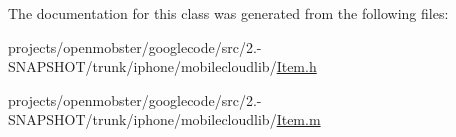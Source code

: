 \-The documentation for this class was generated from the following files\-:\begin{DoxyCompactItemize}
\item 
projects/openmobster/googlecode/src/2.-\/\-S\-N\-A\-P\-S\-H\-O\-T/trunk/iphone/mobilecloudlib/\hyperlink{_item_8h}{\-Item.\-h}\item 
projects/openmobster/googlecode/src/2.-\/\-S\-N\-A\-P\-S\-H\-O\-T/trunk/iphone/mobilecloudlib/\hyperlink{_item_8m}{\-Item.\-m}\end{DoxyCompactItemize}
